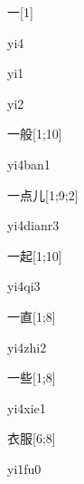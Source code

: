 \begin{verbete}[yi4]{一}[1]
\begin{pronuncia}{yi4}
\end{pronuncia}
\begin{pronuncia}{yi1}
\end{pronuncia}
\begin{pronuncia}{yi2}
\end{pronuncia}
\end{verbete}

\begin{verbete}[yi4ban1]{一般}[1;10]
\begin{pronuncia}{yi4ban1}
\end{pronuncia}
\end{verbete}

\begin{verbete}[yi4dianr3]{一点儿}[1;9;2]
\begin{pronuncia}{yi4dianr3}
\end{pronuncia}
\end{verbete}

\begin{verbete}[yi4qi3]{一起}[1;10]
\begin{pronuncia}{yi4qi3}
\end{pronuncia}
\end{verbete}

\begin{verbete}[yi4zhi2]{一直}[1;8]
\begin{pronuncia}{yi4zhi2}
\end{pronuncia}
\end{verbete}

\begin{verbete}[yi4xie1]{一些}[1;8]
\begin{pronuncia}{yi4xie1}
\end{pronuncia}
\end{verbete}

\begin{verbete}[yi1fu0]{衣服}[6;8]
\begin{pronuncia}{yi1fu0}
\end{pronuncia}
\end{verbete}

